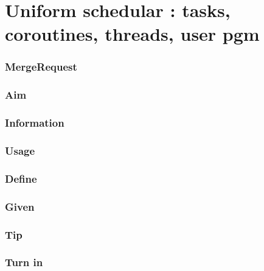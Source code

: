 \documentclass[]{book}
\begin{document}
\section{Uniform schedular : tasks, coroutines, threads, user
pgm}\label{uniform-schedular-tasks-coroutines-threads-user-pgm}

\subsubsection*{MergeRequest}\label{mergerequest-20}

\subsubsection*{Aim}\label{aim-20}

\subsubsection*{Information}\label{information-19}

\subsubsection*{Usage}\label{usage-19}

\subsubsection*{Define}\label{define-19}

\subsubsection*{Given}\label{given-19}

\subsubsection*{Tip}\label{tip-19}

\subsubsection*{Turn in}\label{turn-in-19}
\end{document}
